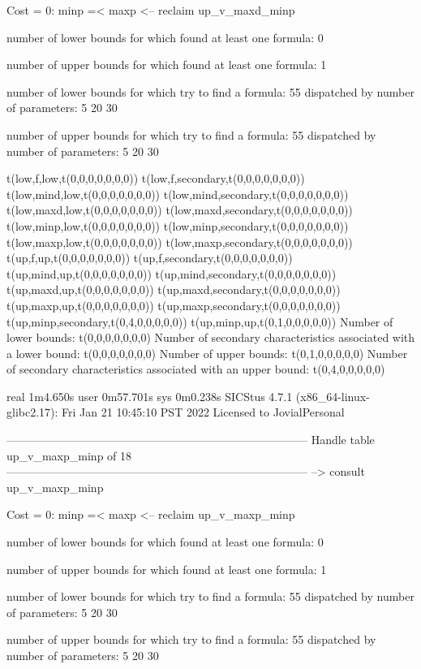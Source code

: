 Cost =  0:  minp =< maxp
<-- reclaim up_v_maxd_minp

number of lower bounds for which found at least one formula: 0

number of upper bounds for which found at least one formula: 1

number of lower bounds for which try to find a formula: 55
dispatched by number of parameters: 5  20  30

number of upper bounds for which try to find a formula: 55
dispatched by number of parameters: 5  20  30

t(low,f,low,t(0,0,0,0,0,0,0))
t(low,f,secondary,t(0,0,0,0,0,0,0))
t(low,mind,low,t(0,0,0,0,0,0,0))
t(low,mind,secondary,t(0,0,0,0,0,0,0))
t(low,maxd,low,t(0,0,0,0,0,0,0))
t(low,maxd,secondary,t(0,0,0,0,0,0,0))
t(low,minp,low,t(0,0,0,0,0,0,0))
t(low,minp,secondary,t(0,0,0,0,0,0,0))
t(low,maxp,low,t(0,0,0,0,0,0,0))
t(low,maxp,secondary,t(0,0,0,0,0,0,0))
t(up,f,up,t(0,0,0,0,0,0,0))
t(up,f,secondary,t(0,0,0,0,0,0,0))
t(up,mind,up,t(0,0,0,0,0,0,0))
t(up,mind,secondary,t(0,0,0,0,0,0,0))
t(up,maxd,up,t(0,0,0,0,0,0,0))
t(up,maxd,secondary,t(0,0,0,0,0,0,0))
t(up,maxp,up,t(0,0,0,0,0,0,0))
t(up,maxp,secondary,t(0,0,0,0,0,0,0))
t(up,minp,secondary,t(0,4,0,0,0,0,0))
t(up,minp,up,t(0,1,0,0,0,0,0))
Number of lower bounds:                                             t(0,0,0,0,0,0,0)
Number of secondary characteristics associated with a lower bound:  t(0,0,0,0,0,0,0)
Number of upper bounds:                                             t(0,1,0,0,0,0,0)
Number of secondary characteristics associated with an upper bound: t(0,4,0,0,0,0,0)

real	1m4.650s
user	0m57.701s
sys	0m0.238s
SICStus 4.7.1 (x86_64-linux-glibc2.17): Fri Jan 21 10:45:10 PST 2022
Licensed to JovialPersonal


--------------------------------------------------------------------------------
Handle table up_v_maxp_minp of 18
--------------------------------------------------------------------------------
--> consult up_v_maxp_minp

Cost =  0:  minp =< maxp
<-- reclaim up_v_maxp_minp

number of lower bounds for which found at least one formula: 0

number of upper bounds for which found at least one formula: 1

number of lower bounds for which try to find a formula: 55
dispatched by number of parameters: 5  20  30

number of upper bounds for which try to find a formula: 55
dispatched by number of parameters: 5  20  30

